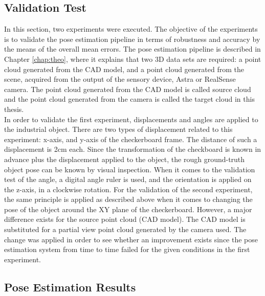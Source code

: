 \subsection{Validation Test}\label{valitest}

In this section, two experiments were executed. The objective of the experiments is to validate the pose estimation pipeline in terms of robustness and accuracy by the means of the overall mean errors. The pose estimation pipeline is described in Chapter \ref{chap:theo}, where it explains that two 3D data sets are required: a point cloud generated from the CAD model, and a point cloud generated from the scene, acquired from the output of the sensory device, Astra or RealSense camera. The point cloud generated from the CAD model is called source cloud and the point cloud generated from the camera is called the target cloud in this thesis.\\
In order to validate the first experiment, displacements and angles are applied to the industrial object. There are two types of displacement related to this experiment: x-axis, and y-axis of the checkerboard frame. The distance of such a displacement is 2cm each. Since the transformation of the checkboard is known in advance plus the displacement applied to the object, the rough ground-truth object pose can be known by visual inspection. When it comes to the validation test of the angle, a digital angle ruler is used, and the orientation is applied on the z-axis, in a clockwise rotation. For the validation of the second experiment, the same principle is applied as described above when it comes to changing the pose of the object around the XY plane of the checkerboard. However, a major difference exists for the source point cloud (CAD model). The CAD model is substituted for a partial view point cloud generated by the camera used. The change was applied in order to see whether an improvement exists since the pose estimation system from time to time failed for the given conditions in the first experiment.

\subsection{Pose Estimation Results}
 
